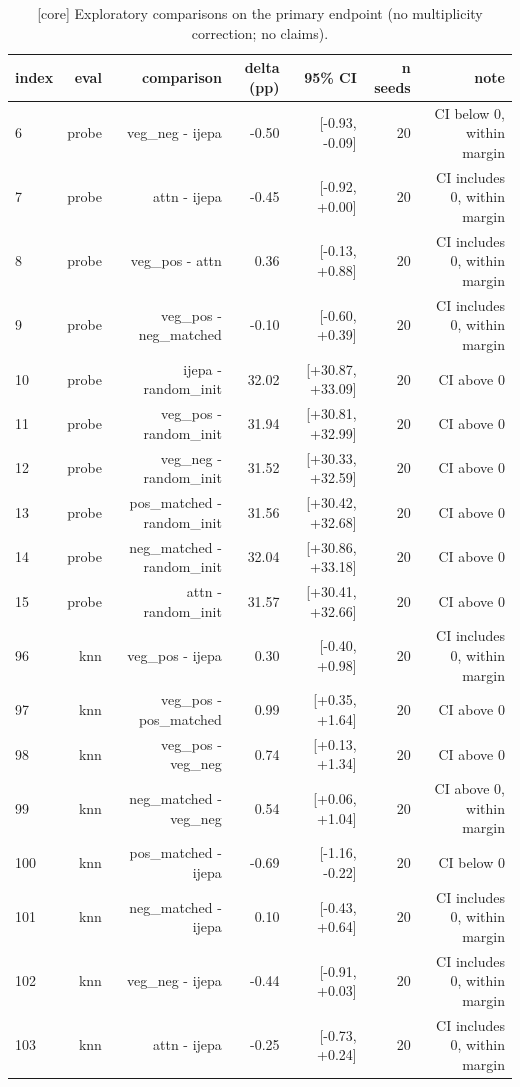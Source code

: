 \begin{table}[t]
\centering
\small
\caption{[core] Exploratory comparisons on the primary endpoint (no multiplicity correction; no claims).}
\label{tab:exploratory_comparisons}
\begin{tabular}{lrrrrrr}
\toprule
index & eval & comparison & delta (pp) & 95\% CI & n seeds & note \\
\midrule
6 & probe & veg\_neg - ijepa & -0.50 & [-0.93, -0.09] & 20 & CI below 0, within margin \\
7 & probe & attn - ijepa & -0.45 & [-0.92, +0.00] & 20 & CI includes 0, within margin \\
8 & probe & veg\_pos - attn & 0.36 & [-0.13, +0.88] & 20 & CI includes 0, within margin \\
9 & probe & veg\_pos - neg\_matched & -0.10 & [-0.60, +0.39] & 20 & CI includes 0, within margin \\
10 & probe & ijepa - random\_init & 32.02 & [+30.87, +33.09] & 20 & CI above 0 \\
11 & probe & veg\_pos - random\_init & 31.94 & [+30.81, +32.99] & 20 & CI above 0 \\
12 & probe & veg\_neg - random\_init & 31.52 & [+30.33, +32.59] & 20 & CI above 0 \\
13 & probe & pos\_matched - random\_init & 31.56 & [+30.42, +32.68] & 20 & CI above 0 \\
14 & probe & neg\_matched - random\_init & 32.04 & [+30.86, +33.18] & 20 & CI above 0 \\
15 & probe & attn - random\_init & 31.57 & [+30.41, +32.66] & 20 & CI above 0 \\
96 & knn & veg\_pos - ijepa & 0.30 & [-0.40, +0.98] & 20 & CI includes 0, within margin \\
97 & knn & veg\_pos - pos\_matched & 0.99 & [+0.35, +1.64] & 20 & CI above 0 \\
98 & knn & veg\_pos - veg\_neg & 0.74 & [+0.13, +1.34] & 20 & CI above 0 \\
99 & knn & neg\_matched - veg\_neg & 0.54 & [+0.06, +1.04] & 20 & CI above 0, within margin \\
100 & knn & pos\_matched - ijepa & -0.69 & [-1.16, -0.22] & 20 & CI below 0 \\
101 & knn & neg\_matched - ijepa & 0.10 & [-0.43, +0.64] & 20 & CI includes 0, within margin \\
102 & knn & veg\_neg - ijepa & -0.44 & [-0.91, +0.03] & 20 & CI includes 0, within margin \\
103 & knn & attn - ijepa & -0.25 & [-0.73, +0.24] & 20 & CI includes 0, within margin \\

\end{tabular}
\end{table}
